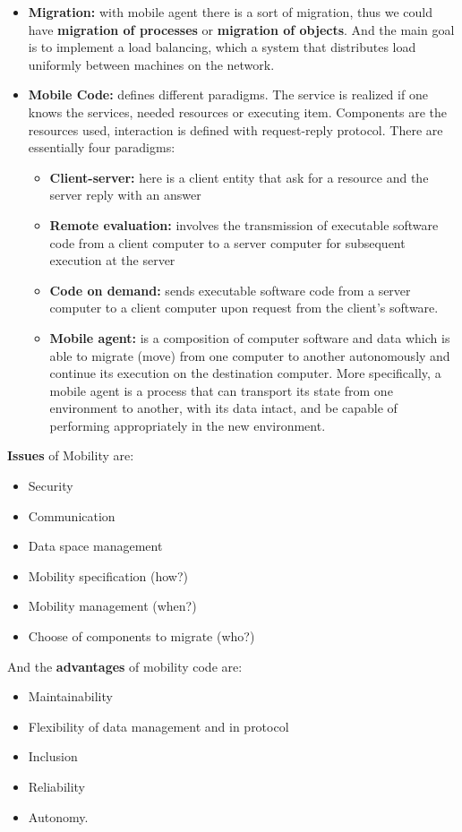 \begin{itemize}
    \item \textbf{Migration:} with mobile agent there is a sort of migration, thus we could have \textbf{migration of processes} or \textbf{migration of objects}. And the main goal is to implement a load balancing, which a system that distributes load uniformly between machines on the network.
    \item \textbf{Mobile Code:} defines different paradigms. The service is realized if one knows the services, needed resources or executing item. Components are the resources used, interaction is defined with request-reply protocol. There are essentially four paradigms:
    \begin{itemize}
        \item \textbf{Client-server:} here is a client entity that ask for a resource and the server reply with an answer
        \item \textbf{Remote evaluation:} involves the transmission of executable software code from a client computer to a server computer for subsequent execution at the server
        \item \textbf{Code on demand:} sends executable software code from a server computer to a client computer upon request from the client’s software.
        \item \textbf{Mobile agent:} is a composition of computer software and data which is able to migrate (move) from one computer to another autonomously and continue its execution on the destination computer. More specifically, a mobile agent is a process that can transport its state from one environment to another, with its data intact, and be capable of performing appropriately in the new environment.
    \end{itemize}
\end{itemize}
\textbf{Issues} of Mobility are:
\begin{itemize}
    \item Security
    \item Communication
    \item Data space management
    \item Mobility specification (how?)
    \item Mobility management (when?)
    \item Choose of components to migrate (who?)
\end{itemize}
And the \textbf{advantages} of mobility code are:
\begin{itemize}
    \item Maintainability
    \item Flexibility of data management and in protocol
    \item Inclusion
    \item Reliability
    \item Autonomy.
\end{itemize}

